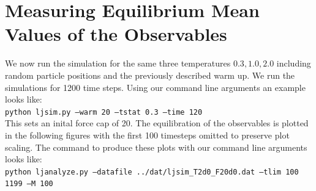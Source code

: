 \section{Measuring Equilibrium Mean Values of the Observables}
We now run the simulation for the same three temperatures ${0.3, 1.0, 2.0}$ including random particle positions and the previously described warm up. We run the simulations for 1200 time steps. Using our command line arguments an example looks like:\\

{\tt python ljsim.py --warm 20 --tstat 0.3 --time 120}\\

This sets an inital force cap of 20. The equilibration of the observables is plotted in the following figures with the first 100 timesteps omitted to preserve plot scaling. The command to produce these plots with our command line arguments looks like:\\

{\tt python ljanalyze.py --datafile ../dat/ljsim\_T2d0\_F20d0.dat --tlim 100 1199 --M 100}\\

